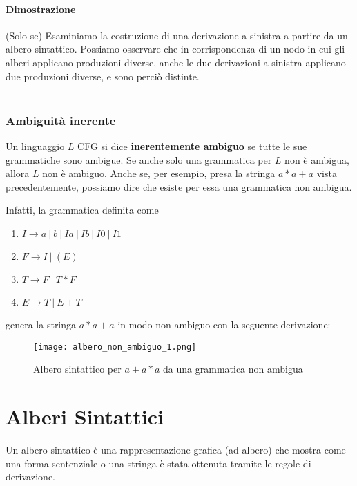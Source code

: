 \documentclass[11pt]{article}
\begin{document}
\paragraph{Dimostrazione} (Solo se) Esaminiamo la costruzione di una derivazione a sinistra a partire da un albero sintattico. Possiamo osservare che in corrispondenza di un nodo in cui gli alberi applicano produzioni diverse, anche le due derivazioni a sinistra applicano due produzioni diverse, e sono perciò distinte.
\\ \\
\subsubsection{Ambiguità inerente}
 Un linguaggio $L$ CFG si dice \textbf{inerentemente ambiguo} se tutte le sue grammatiche sono ambigue. Se anche solo una grammatica per $L$ non è ambigua, allora $L$ non è ambiguo. Anche se, per esempio, presa la stringa $a*a+a$ vista precedentemente, possiamo dire che esiste per essa una grammatica non ambigua.
 
 Infatti, la grammatica definita come
 \begin{enumerate}
 	\item $I \rightarrow a\medspace |\medspace b\medspace |\medspace Ia\medspace |\medspace Ib\medspace |\medspace I0\medspace |\medspace I1$
 	\item $F \rightarrow I\medspace |\medspace (E)$
 	\item $T \rightarrow F \medspace | \medspace T*F$
 	\item $E \rightarrow T\medspace |\medspace E+T$
\end{enumerate}
genera la stringa $a*a+a$ in modo non ambiguo con la seguente derivazione:

\begin{figure}[H]
\caption{Albero sintattico per $a+a*a$ da una grammatica non ambigua}
\texttt{[image: albero\_non\_ambiguo\_1.png]}
\centering
\end{figure}  

\section{Alberi Sintattici}
Un albero sintattico è una rappresentazione grafica (ad albero) che mostra come una forma sentenziale o una stringa è stata ottenuta tramite le regole di derivazione.
\end{document}
